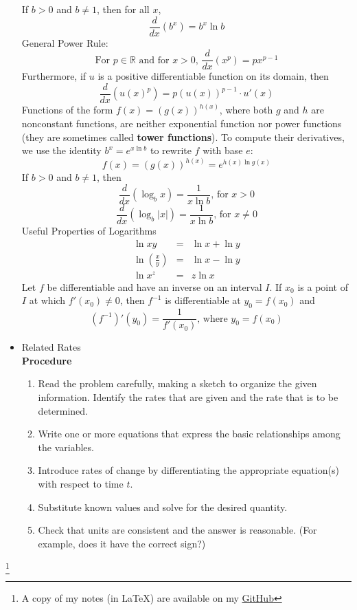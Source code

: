 \documentclass{article}
\newcommand\blfootnote[1]{
    \begingroup
    \renewcommand\thefootnote{}\footnote{#1}
    \addtocounter{footnote}{-1}
    \endgroup
}
\begin{document}
\begin{itemize}
    If $b > 0$ and $b \neq 1$, then for all $x$,
    $$\frac{d}{dx}\left(b^x\right) = b^x\ln{b}$$
    General Power Rule:
    $$\text{For } p \in \mathbb{R} \text{ and for } x > 0 \text{, } \frac{d}{dx}\left(x^p\right) = px^{p - 1}$$
    Furthermore, if $u$ is a positive differentiable function on its domain, then
    $$\frac{d}{dx}\left(u\left(x\right)^p\right) = p\left(u\left(x\right)\right)^{p - 1} \cdot u'\left(x\right)$$
    Functions of the form $f(x) = \left(g(x)\right)^{h(x)}$, where both $g$ and $h$ are nonconstant functions, are neither exponential function nor power functions (they are sometimes called \textbf{tower functions}). To compute their derivatives, we use the identity $b^x = e^{x\ln{b}}$ to rewrite $f$ with base $e$:
    $$f(x) = \left(g(x)\right)^{h(x)} = e^{h(x)\ln{g(x)}}$$
    If $b > 0$ and $b \neq 1$, then
    $$\frac{d}{dx}\left(\log_b{x}\right) = \frac{1}{x\ln{b}} \text{, for } x > 0$$
    $$\frac{d}{dx}\left(\log_b{|x|}\right) = \frac{1}{x\ln{b}} \text{, for } x \neq 0$$
    Useful Properties of Logarithms
    \begin{eqnarray}
        \ln{xy} &=& \ln{x} + \ln{y} \\
        \ln{\left(\frac{x}{y}\right)} &=& \ln{x} - \ln{y} \\
        \ln{x^z} &=& z\ln{x}
    \end{eqnarray}
    Let $f$ be differentiable and have an inverse on an interval $I$. If $x_0$ is a point of $I$ at which $f'(x_0) \neq 0$, then $f^{-1}$ is differentiable at $y_0 = f(x_0)$ and
    $$\left(f^{-1}\right)'\left(y_0\right) = \frac{1}{f'\left(x_0\right)} \text{, where } y_0 = f\left(x_0\right)$$
    \item Related Rates
    \\ \textbf{Procedure}
    \begin{enumerate}
        \item Read the problem carefully, making a sketch to organize the given information. Identify the rates that are given and the rate that is to be determined.
        \item Write one or more equations that express the basic relationships among the variables.
        \item Introduce rates of change by differentiating the appropriate equation(s) with respect to time $t$.
        \item Substitute known values and solve for the desired quantity.
        \item Check that units are consistent and the answer is reasonable. (For example, does it have the correct sign?)
    \end{enumerate}
\end{itemize}

\blfootnote{A copy of my notes (in \LaTeX) are available on my \href{https://github.com/onlinechronically/MATH-211}{GitHub}}
\end{document}
